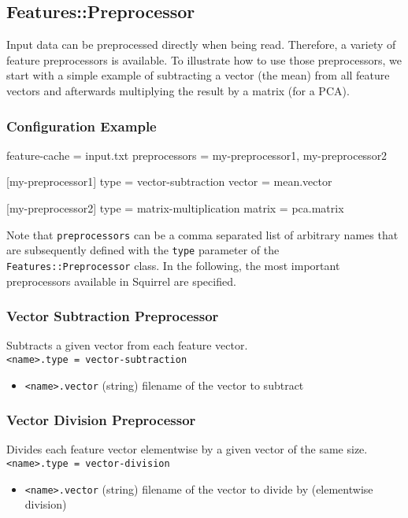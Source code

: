 \subsection{Features::Preprocessor}


Input data can be preprocessed directly when being read. Therefore, a variety of feature preprocessors is available. To illustrate how to use those preprocessors, we start with a simple example of subtracting a vector (\eg the mean) from all feature vectors and afterwards multiplying the result by a matrix (\eg for a PCA).

\subsubsection*{Configuration Example}

\begin{config}
feature-cache = input.txt
preprocessors = my-preprocessor1, my-preprocessor2

[my-preprocessor1]
type          = vector-subtraction
vector        = mean.vector

[my-preprocessor2]
type          = matrix-multiplication
matrix        = pca.matrix
\end{config}

Note that \texttt{preprocessors} can be a comma separated list of arbitrary names that are subsequently defined with the \texttt{type} parameter of the \texttt{Features::Preprocessor} class. In  the following, the most important preprocessors available in Squirrel are specified.

\subsubsection*{Vector Subtraction Preprocessor}
Subtracts a given vector from each feature vector.\\
\texttt{<name>.type = vector-subtraction}
\begin{itemize}
    \item \texttt{<name>.vector} (string) filename of the vector to subtract
\end{itemize}

\subsubsection*{Vector Division Preprocessor}
Divides each feature vector elementwise by a given vector of the same size.\\
\texttt{<name>.type = vector-division}
\begin{itemize}
    \item \texttt{<name>.vector} (string) filename of the vector to divide by (elementwise division)
\end{itemize}

